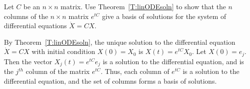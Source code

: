 \documentclass{ximera}
\begin{document}
\begin{exercise}  \label{c6.2.6A}
Let $C$ be an $n\times n$ matrix.  Use Theorem~\ref{T:linODEsoln} to show
that the $n$ columns of the $n\times n$ matrix $e^{tC}$ give a basis of
solutions for the system of differential equations $\dot{X}=CX$.

\begin{solution}
By Theorem~\ref{T:linODEsoln},
the unique solution to the differential equation $\dot{X} = CX$ with
initial condition $X(0) = X_0$ is $X(t) = e^{tC}X_0$.  Let $X(0) =
e_j$.  Then the vector $X_j(t) = e^{tC}e_j$ is a solution to the
differential equation, and is the $j^{th}$ column of the matrix
$e^{tC}$.  Thus, each column of $e^{tC}$ is a solution to the
differential equation, and the set of columns forms a basis of
solutions.


\end{solution}
\end{exercise}
\end{document}
